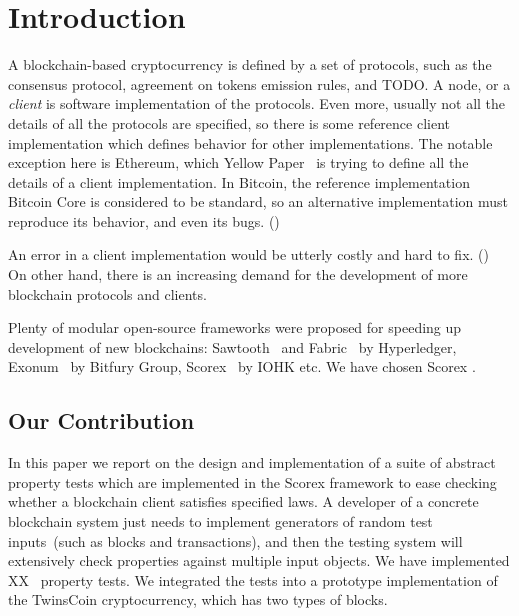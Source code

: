 
\section{Introduction}

A blockchain-based cryptocurrency is defined by a set of protocols, such as the consensus protocol, agreement on tokens emission rules, and TODO. A node, or a {\em client} is software implementation of the protocols. Even more, usually not all the details of all the protocols are specified, so there is some reference client implementation which defines behavior for other implementations. The notable exception here is Ethereum, which Yellow Paper~\cite{ethyp} is trying to define all the details of a client implementation. In Bitcoin, the reference implementation Bitcoin Core is considered to be standard, so an alternative implementation must reproduce its behavior, and even its bugs. ()

An error in a client implementation would be utterly costly and hard to fix. () On other hand, there is an increasing demand for the development of more blockchain protocols and clients. 

Plenty of modular open-source frameworks were proposed for speeding up development of new blockchains: Sawtooth~\cite{sawtooth} and Fabric~\cite{fabric} by Hyperledger, Exonum~\cite{exonum} by Bitfury Group, Scorex~\cite{scorex} by IOHK etc. We have chosen Scorex .


\subsection{Our Contribution}

In this paper we report on the design and implementation of a suite of abstract property tests which are implemented in the Scorex framework to ease checking whether a blockchain client satisfies specified laws. A developer of a concrete blockchain system just needs to implement generators of random test inputs~(such as blocks and transactions), and then the testing system will extensively check properties against multiple input objects. We have implemented XX~ property tests. We integrated the tests into a prototype implementation of the TwinsCoin cryptocurrency, which has two types of blocks.  
